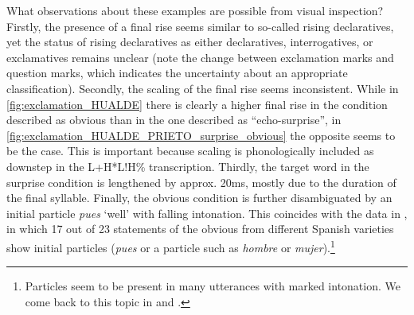 What observations about these examples are possible from visual inspection? Firstly, the presence of a final rise seems similar to so-called rising declaratives, yet the status of rising declaratives as either declaratives, interrogatives, or exclamatives remains unclear (note the change between exclamation marks and question marks, which indicates the uncertainty about an appropriate classification). Secondly, the scaling of the final rise seems inconsistent. While in \autoref{fig:exclamation_HUALDE} there is clearly a higher final rise in the condition described as obvious than in the one described as ``echo-surprise'', in \autoref{fig:exclamation_HUALDE_PRIETO_surprise_obvious} the opposite seems to be the case. This is important because scaling is phonologically included as downstep in the L+H*L!H\% transcription. Thirdly, the target word in the surprise condition 
is lengthened by approx. 20ms, mostly due to the duration of the final 
syllable. Finally, the obvious condition is further disambiguated by an initial 
particle \textit{pues} `well' with falling intonation. This coincides with 
the data in \citet{Prieto2009-2013}, in which 17 out of 23 statements of the obvious from different Spanish varieties show initial particles
(\textit{pues} or a particle such as \textit{hombre} or \textit{mujer}).\footnote{Particles seem to be present in many utterances with marked intonation. We come back to this topic in  and .}



%			

